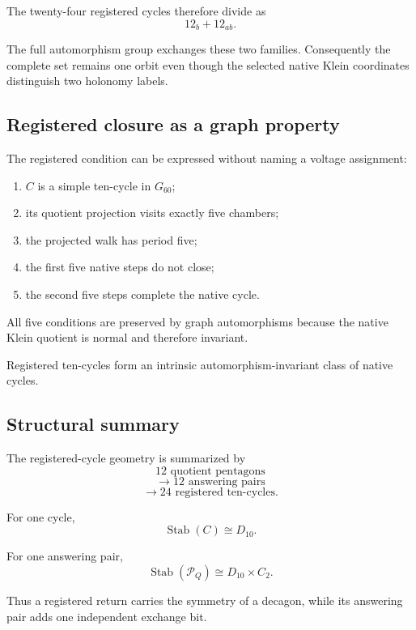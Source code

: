The twenty-four registered cycles therefore divide as
\[
12_b+12_{ab}.
\]

The full automorphism group exchanges these two families. Consequently
the complete set remains one orbit even though the selected native
Klein coordinates distinguish two holonomy labels.

\subsection{Registered closure as a graph property}

The registered condition can be expressed without naming a voltage
assignment:

\begin{enumerate}
    \item \(C\) is a simple ten-cycle in \(G_{60}\);
    \item its quotient projection visits exactly five chambers;
    \item the projected walk has period five;
    \item the first five native steps do not close;
    \item the second five steps complete the native cycle.
\end{enumerate}

All five conditions are preserved by graph automorphisms because the
native Klein quotient is normal and therefore invariant.

\begin{corollary}
Registered ten-cycles form an intrinsic automorphism-invariant class
of native cycles.
\end{corollary}

\subsection{Structural summary}

The registered-cycle geometry is summarized by
\[
12
\text{ quotient pentagons}
\]
\[
\longrightarrow
12
\text{ answering pairs}
\]
\[
\longrightarrow
24
\text{ registered ten-cycles}.
\]

For one cycle,
\[
\operatorname{Stab}(C)\cong D_{10}.
\]

For one answering pair,
\[
\operatorname{Stab}(\mathcal P_Q)
\cong D_{10}\times C_2.
\]

Thus a registered return carries the symmetry of a decagon, while its
answering pair adds one independent exchange bit.
